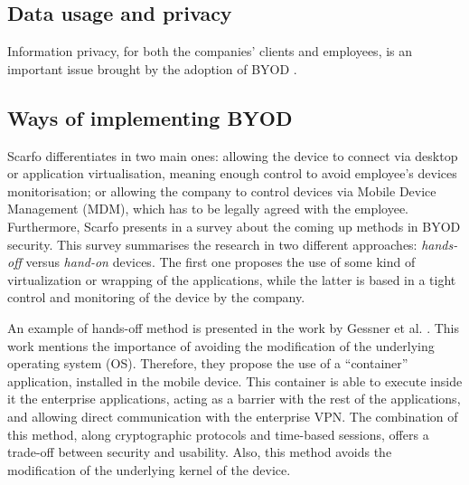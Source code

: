 \subsection{Data usage and privacy}

Information privacy, for both the companies' clients and employees, is an important issue brought by the adoption of BYOD \cite{Garba15organisational}. %

\subsection{Ways of implementing BYOD}

Scarfo differentiates in \cite{scarfo2012new} two main ones: allowing the device to connect via desktop or application virtualisation, meaning enough control to avoid employee's devices monitorisation; or allowing the company to control devices via Mobile Device Management (MDM), which has to be legally agreed with the employee. Furthermore, Scarfo presents in \cite{Scarfo12survey} a survey about the coming up methods in BYOD security. This survey summarises the research in two different approaches: {\em hands-off} versus {\em hand-on} devices. The first one proposes the use of some kind of virtualization or wrapping of the applications, while the latter is based in a tight control and monitoring of the device by the company.

An example of hands-off method is presented in the work by Gessner et al. \cite{Gessner13userfriendly}. This work mentions the importance of avoiding the modification of the underlying operating system (OS). Therefore, they propose the use of a ``container'' application, installed in the mobile device. This container is able to execute inside it the enterprise applications, acting as a barrier with the rest of the applications, and allowing direct communication with the enterprise VPN. The combination of this method, along cryptographic protocols and time-based sessions, offers a trade-off between security and usability. Also, this method avoids the modification of the underlying kernel of the device.

